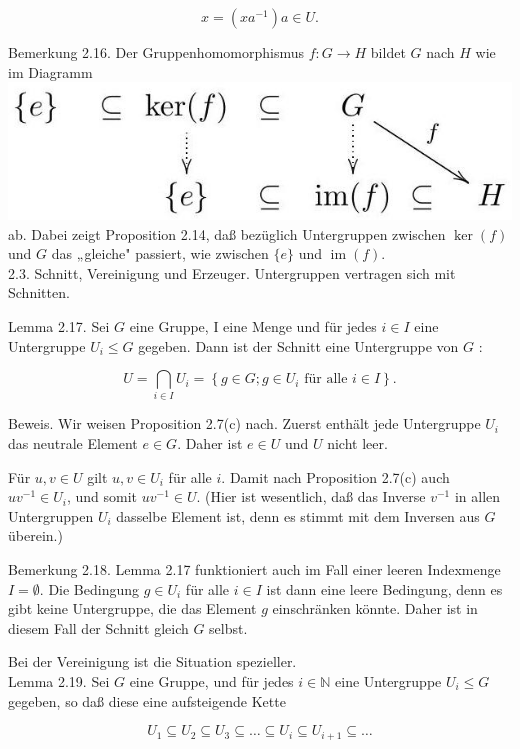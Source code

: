 \documentclass[10pt, letterpaper]{article}
\begin{document}
$$
x=\left(x a^{-1}\right) a \in U .
$$

Bemerkung 2.16. Der Gruppenhomomorphismus $f: G \rightarrow H$ bildet $G$ nach $H$ wie im Diagramm\\
\includegraphics[max width=\textwidth, center]{2025_06_13_6ba93caed1e95a95104eg-017}\\
ab. Dabei zeigt Proposition 2.14, daß bezüglich Untergruppen zwischen $\operatorname{ker}(f)$ und $G$ das „gleiche" passiert, wie zwischen $\{e\}$ und $\operatorname{im}(f)$.\\
2.3. Schnitt, Vereinigung und Erzeuger. Untergruppen vertragen sich mit Schnitten.

Lemma 2.17. Sei $G$ eine Gruppe, I eine Menge und für jedes $i \in I$ eine Untergruppe $U_{i} \leq G$ gegeben. Dann ist der Schnitt eine Untergruppe von $G$ :

$$
U=\bigcap_{i \in I} U_{i}=\left\{g \in G ; g \in U_{i} \text { für alle } i \in I\right\} .
$$

Beweis. Wir weisen Proposition 2.7(c) nach. Zuerst enthält jede Untergruppe $U_{i}$ das neutrale Element $e \in G$. Daher ist $e \in U$ und $U$ nicht leer.

Für $u, v \in U$ gilt $u, v \in U_{i}$ für alle $i$. Damit nach Proposition 2.7(c) auch $u v^{-1} \in U_{i}$, und somit $u v^{-1} \in U$. (Hier ist wesentlich, daß das Inverse $v^{-1}$ in allen Untergruppen $U_{i}$ dasselbe Element ist, denn es stimmt mit dem Inversen aus $G$ überein.)

Bemerkung 2.18. Lemma 2.17 funktioniert auch im Fall einer leeren Indexmenge $I=\emptyset$. Die Bedingung $g \in U_{i}$ für alle $i \in I$ ist dann eine leere Bedingung, denn es gibt keine Untergruppe, die das Element $g$ einschränken könnte. Daher ist in diesem Fall der Schnitt gleich $G$ selbst.

Bei der Vereinigung ist die Situation spezieller.\\
Lemma 2.19. Sei $G$ eine Gruppe, und für jedes $i \in \mathbb{N}$ eine Untergruppe $U_{i} \leq G$ gegeben, so daß diese eine aufsteigende Kette

$$
U_{1} \subseteq U_{2} \subseteq U_{3} \subseteq \ldots \subseteq U_{i} \subseteq U_{i+1} \subseteq \ldots
$$
\end{document}
